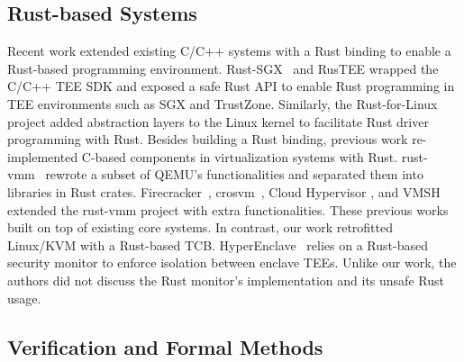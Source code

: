 \subsection{Rust-based Systems}
Recent work extended existing C/C++ systems with a Rust binding to enable
a Rust-based programming environment. Rust-SGX~\cite{rustsgx} and RusTEE
\cite{rustee} wrapped the C/C++ TEE SDK and exposed a safe Rust API
to enable Rust programming in TEE environments such as SGX and TrustZone.
Similarly, the Rust-for-Linux~\cite{Rust-for-Linux} project added
abstraction layers to the Linux kernel to facilitate Rust driver
programming with Rust.
Besides building a Rust binding, previous work re-implemented C-based
components in virtualization systems with Rust.
rust-vmm~\cite{rust-vmm} rewrote a subset of QEMU's functionalities
and separated them into libraries in Rust crates.
Firecracker~\cite{Firecracker}, crosvm~\cite{crosvm}, Cloud Hypervisor
\cite{CloudHypervisor}, and VMSH~\cite{VMSH} extended the
rust-vmm project with extra functionalities. These previous works
built on top of existing core systems. In contrast, our work
retrofitted Linux/KVM with a Rust-based TCB.
HyperEnclave~\cite{hyperenclave} relies on a Rust-based security
monitor to enforce isolation between enclave TEEs. Unlike
our work, the authors did not discuss the Rust monitor's implementation
and its unsafe Rust usage.

\subsection{Verification and Formal Methods}

